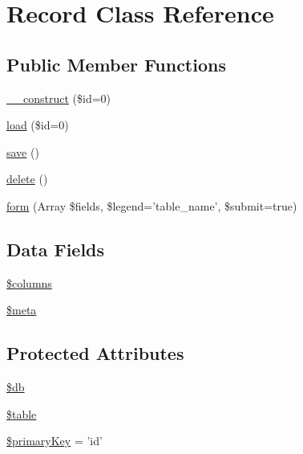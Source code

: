 \hypertarget{class_record}{\section{Record Class Reference}
\label{class_record}
}
\subsection*{Public Member Functions}
\begin{DoxyCompactItemize}
\item 
\hyperlink{class_record_a4e176c3a661053094339903c5cfc7942}{\-\_\-\-\_\-construct} (\$id=0)
\item 
\hyperlink{class_record_a7160b09d9d37ede69811a66dc9e4f272}{load} (\$id=0)
\item 
\hyperlink{class_record_afc8a3c62679cf00ade9f15fb2a6d6132}{save} ()
\item 
\hyperlink{class_record_a13bdffdd926f26b825ea57066334ff01}{delete} ()
\item 
\hyperlink{class_record_a93614c4fd6ba6715b5d339e6b4720d34}{form} (Array \$fields, \$legend='table\-\_\-name', \$submit=true)
\end{DoxyCompactItemize}
\subsection*{Data Fields}
\begin{DoxyCompactItemize}
\item 
\hyperlink{class_record_a19d2a3d21fe02053311fde465e6ae2e9}{\$columns}
\item 
\hyperlink{class_record_a9e6fc1ae0498be7d1e682f8bcc9299df}{\$meta}
\end{DoxyCompactItemize}
\subsection*{Protected Attributes}
\begin{DoxyCompactItemize}
\item 
\hyperlink{class_record_a1fa3127fc82f96b1436d871ef02be319}{\$db}
\item 
\hyperlink{class_record_ae8876a14058f368335baccf35af4a22b}{\$table}
\item 
\hyperlink{class_record_a927b0256b942a3ee89485f2649af7981}{\$primary\-Key} = 'id'
\end{DoxyCompactItemize}


